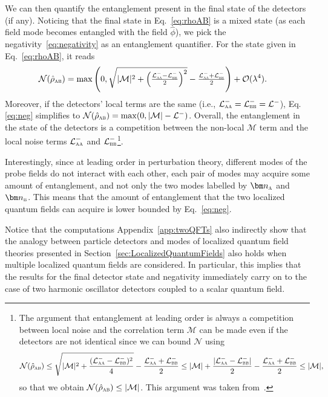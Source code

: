 \documentclass[letterpaper,12pt,titlepage,oneside,final]{book}
\renewcommand{\r}{\hat{\rho}}
\newcommand{\tc}[1]{\textsc{#1}}
\begin{document}
    
We can then quantify the entanglement present in the final state of the detectors (if any). Noticing that the final state in Eq.~\eqref{eq:rhoAB} is a mixed state (as each field mode becomes entangled with the field $\hat{\phi}$), we pick the negativity~\eqref{eq:negativity} as an entanglement quantifier. For the state given in Eq.~\eqref{eq:rhoAB}, it reads
\begin{align}\label{eq:neg}
    \mathcal{N}(\r_\tc{ab}) &= \max\left(0,\sqrt{|\mathcal{M}|^2 + \left(\tfrac{\mathcal{L}^-_\tc{aa} - \mathcal{L}^-_\tc{bb}}{2}\right)^2} - \tfrac{\mathcal{L}^-_{\tc{aa}} + \mathcal{L}^-_\tc{bb}}{2}\right) + \mathcal{O}(\lambda^4).
\end{align}
Moreover, if the detectors' local terms are the same (i.e., $\mathcal{L}^-_\tc{aa} = \mathcal{L}^-_\tc{bb} = \mathcal{L}^-$), Eq. \eqref{eq:neg} simplifies to \mbox{$\mathcal{N}(\r_\tc{ab}) = \max(0,|\mathcal{M}| - \mathcal{L}^-)$}. Overall, the entanglement in the state of the detectors is a competition between the non-local $\mathcal{M}$ term and the local noise terms $\mathcal{L}^-_\tc{aa}$ and $\mathcal{L}^-_\tc{bb}$\footnote{The argument that entanglement at leading order is always a competition between local noise and the correlation term $\mathcal{M}$  can be made even if the detectors are not identical since we can bound $\mathcal{N}$ using
 \begin{align}\label{eq:negab2fields}
    \mathcal{N}(\r_\tc{ab})\leq \sqrt{|\mathcal{M}|^2+\frac{(\mathcal{L}^-_{\textsc{aa}} - \mathcal{L}^-_{\textsc{bb}})^2}{4}} - \frac{\mathcal{L}^-_{\textsc{aa}} + \mathcal{L}^-_{\textsc{bb}}}{2} \leq |\mathcal{M}|+\frac{|\mathcal{L}^-_{\textsc{aa}} - \mathcal{L}^-_{\textsc{bb}}|}{{2}} - \frac{\mathcal{L}^-_{\textsc{aa}} + \mathcal{L}^-_{\textsc{bb}}}{2} \leq |\mathcal{M}|,
\end{align}
so that we obtain $\mathcal{N}(\r_\tc{ab}) \leq |\mathcal{M}|$. This argument was taken from~\cite{hectorMass}.}.

    Interestingly, since at leading order in perturbation theory, different modes of the probe fields do not interact with each other, each pair of modes may acquire some amount of entanglement, and not only the two modes labelled by $\bm n_\tc{a}$ and $\bm n_\tc{b}$. This means that the amount of entanglement that the two localized quantum fields can acquire is lower bounded by Eq.~\eqref{eq:neg}.
    
    Notice that the computations Appendix~\ref{app:twoQFTs} also indirectly show that the analogy between particle detectors and modes of localized quantum field theories presented in Section~\ref{sec:LocalizedQuantumFields} also holds when multiple localized quantum fields are considered. In particular, this implies that the results for the final detector state and negativity immediately carry on to the case of two harmonic oscillator detectors coupled to a scalar quantum field.
\end{document}
